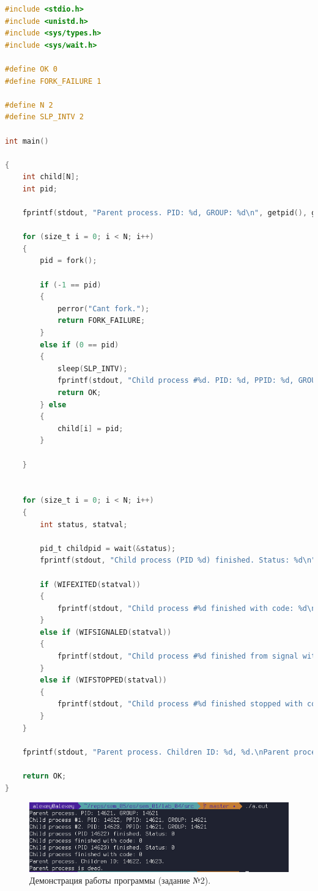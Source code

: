 \documentclass[12pt]{report}
\begin{document}
\begin{lstlisting}[label=some-code,caption=Вызов функции wait(),language=C]
#include <stdio.h>
#include <unistd.h>
#include <sys/types.h>
#include <sys/wait.h>

#define OK 0
#define FORK_FAILURE 1

#define N 2
#define SLP_INTV 2

int main()

{
	int child[N];
	int pid;
	
	fprintf(stdout, "Parent process. PID: %d, GROUP: %d\n", getpid(), getpgrp());
	
	for (size_t i = 0; i < N; i++)
	{
		pid = fork();
		
		if (-1 == pid)
		{
			perror("Cant fork.");
			return FORK_FAILURE;
		}
		else if (0 == pid)
		{
			sleep(SLP_INTV);
			fprintf(stdout, "Child process #%d. PID: %d, PPID: %d, GROUP: %d\n", i + 1, getpid(), getppid(), getpgrp());
			return OK;
		} else
		{
			child[i] = pid;
		}

	}

	
	for (size_t i = 0; i < N; i++)
	{
		int status, statval;
		
		pid_t childpid = wait(&status);
		fprintf(stdout, "Child process (PID %d) finished. Status: %d\n", childpid, status);
		
        if (WIFEXITED(statval))
		{
			fprintf(stdout, "Child process #%d finished with code: %d\n", i + 1, WEXITSTATUS(statval));
		}
		else if (WIFSIGNALED(statval))
		{
			fprintf(stdout, "Child process #%d finished from signal with code: %d\n", i + 1, WTERMSIG(statval));
		}
		else if (WIFSTOPPED(statval))
		{
			fprintf(stdout, "Child process #%d finished stopped with code: %d\n", i + 1, WSTOPSIG(statval));
		}
	}
	
	fprintf(stdout, "Parent process. Children ID: %d, %d.\nParent process is dead.\n", child[0], child[1]);
	
	return OK;
}
\end{lstlisting}

\begin{figure}[H]

	\centering

	\includegraphics[width=\linewidth]{img/task02.png}
	\caption{Демонстрация работы программы (задание №2).}

	\label{fig:task02}

\end{figure}
\end{document}
